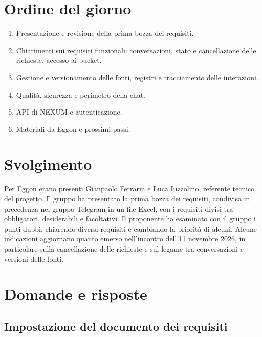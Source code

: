 \documentclass[verbale=esterno]{gpt}
\begin{document}
\section{Ordine del giorno}
\begin{enumerate}
  \item Presentazione e revisione della prima bozza dei requisiti.
  \item Chiarimenti sui requisiti funzionali: conversazioni, stato e cancellazione delle richieste, accesso ai bucket.
  \item Gestione e versionamento delle fonti, registri e tracciamento delle interazioni.
  \item Qualità, sicurezza e perimetro della chat.
  \item API di NEXUM e autenticazione.
  \item Materiali da Eggon e prossimi passi.
\end{enumerate}

\section{Svolgimento}
Per Eggon erano presenti Gianpaolo Ferrarin e Luca Iuzzolino, referente tecnico del progetto. Il gruppo ha presentato la prima bozza dei requisiti, condivisa in precedenza nel gruppo Telegram in un file Excel, con i requisiti divisi tra obbligatori, desiderabili e facoltativi. Il proponente ha esaminato con il gruppo i punti dubbi, chiarendo diversi requisiti e cambiando la priorità di alcuni. Alcune indicazioni aggiornano quanto emerso nell'incontro dell'11 novembre 2026, in particolare sulla cancellazione delle richieste e sul legame tra conversazioni e versioni delle fonti.

\section{Domande e risposte}

\subsection{Impostazione del documento dei requisiti}

\end{document}
